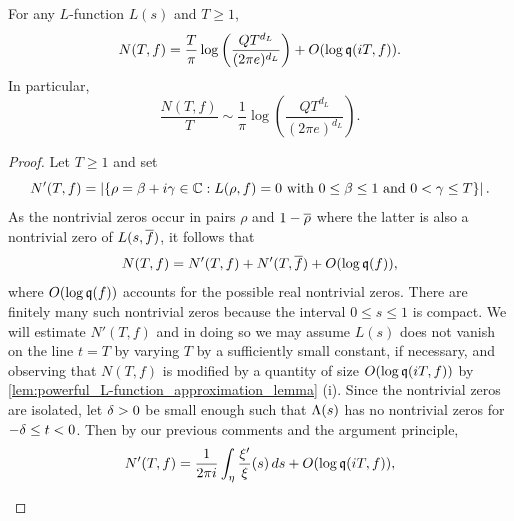 \documentclass[12pt]{article}
\begin{document}
    \begin{theorem}\label{thm:zero_counting}
      For any \(L\)-function \(L(s)\) and \(T \ge 1\),
      \[
        N(T,f) = \frac{T}{\pi}\log\left(\frac{QT^{d_{L}}}{(2\pi e)^{d_{L}}}\right)+O(\log{\mathfrak{q}(iT,f)}).
      \]
      In particular,
      \[
        \frac{N(T,f)}{T} \sim \frac{1}{\pi}\log\left(\frac{QT^{d_{L}}}{(2\pi e)^{d_{L}}}\right).
      \]
    \end{theorem}
    \begin{proof}
      Let \(T \ge 1\) and set
      \[
        N'(T,f) = \left|\{\rho = \beta+i\gamma \in \mathbb{C}:L(\rho,f) = 0 \text{ with } 0 \le \beta \le 1 \text{ and } 0 < \gamma \le T\}\right|.
      \]
      As the nontrivial zeros occur in pairs \(\rho\) and \(1-\overline{\rho}\) where the latter is also a nontrivial zero of \(L(s,\overline{f})\), it follows that
      \[
        N(T,f) = N'(T,f)+N'(T,\overline{f})+O(\log{\mathfrak{q}(f)}),
      \]
      where \(O(\log{\mathfrak{q}(f)})\) accounts for the possible real nontrivial zeros. There are finitely many such nontrivial zeros because the interval \(0 \le s \le 1\) is compact. We will estimate \(N'(T,f)\) and in doing so we may assume \(L(s)\) does not vanish on the line \(t = T\) by varying \(T\) by a sufficiently small constant, if necessary, and observing that \(N(T,f)\) is modified by a quantity of size \(O(\log{\mathfrak{q}(iT,f)})\) by \cref{lem:powerful_L-function_approximation_lemma} (i). Since the nontrivial zeros are isolated, let \(\delta > 0\) be small enough such that \(\Lambda(s)\) has no nontrivial zeros for \(-\delta \le t < 0\). Then by our previous comments and the argument principle,
      \[
        N'(T,f) = \frac{1}{2\pi i}\int_{\eta}\frac{\xi'}{\xi}(s)\,ds+O(\log{\mathfrak{q}(iT,f)}),
      \]

      \begin{figure}[ht]
        \centering
\end{figure}
\end{proof}
\end{document}
